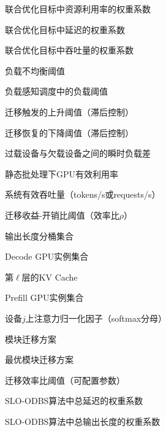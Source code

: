\begin{denotation}[3cm]
  \item[$\alpha$]联合优化目标中资源利用率的权重系数
  \item[$\beta$]联合优化目标中延迟的权重系数
  \item[$\gamma$]联合优化目标中吞吐量的权重系数
  \item[$\delta$]负载不均衡阈值
  \item[$\delta_L$]负载感知调度中的负载阈值
  \item[$\delta_\uparrow$]迁移触发的上升阈值（滞后控制）
  \item[$\delta_\downarrow$]迁移恢复的下降阈值（滞后控制）
  \item[$\Delta$]过载设备与欠载设备之间的瞬时负载差
  \item[$\eta_{\text{static}}$]静态批处理下GPU有效利用率
  \item[$\Theta$]系统有效吞吐量（tokens/s或requests/s）
  \item[$\kappa$]迁移收益-开销比阈值（效率比$\rho$）
  \item[$\mathcal{B}$]输出长度分桶集合
  \item[$\mathcal{D}$]Decode GPU实例集合
  \item[$\mathcal{K}_\ell$]第$\ell$层的KV Cache
  \item[$\mathcal{P}$]Prefill GPU实例集合
  \item[$\ell^{(j)}$]设备$j$上注意力归一化因子（softmax分母）
  \item[$\pi$]模块迁移方案
  \item[$\pi^*$]最优模块迁移方案
  \item[$\rho$]迁移效率比阈值（可配置参数）
  \item[$w_1$]SLO-ODBS算法中总延迟的权重系数
  \item[$w_2$]SLO-ODBS算法中总输出长度的权重系数

\end{denotation}
